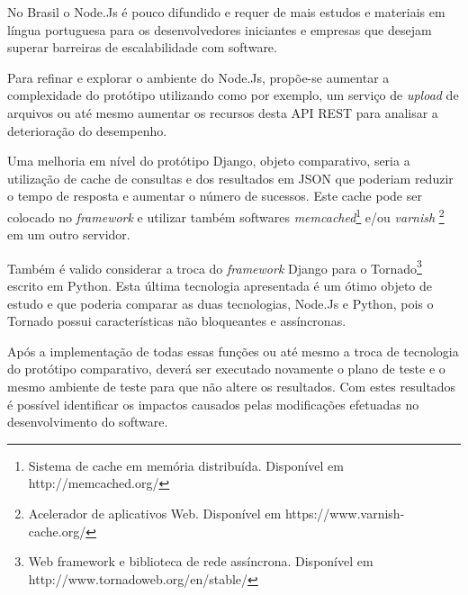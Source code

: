  No Brasil o Node.Js é pouco difundido e requer de mais estudos e materiais em língua portuguesa para os desenvolvedores iniciantes
  e empresas que desejam superar barreiras de escalabilidade com software. 
  
  Para refinar e explorar o ambiente do Node.Js, propõe-se aumentar a complexidade do protótipo utilizando como por
  exemplo, um serviço de \textit{upload} de arquivos ou até mesmo aumentar os recursos desta API REST para analisar 
  a deterioração do desempenho.
 
  Uma melhoria em nível do protótipo Django, objeto comparativo, seria a utilização de cache de consultas e dos resultados em \ac{JSON} que poderiam
  reduzir o tempo de resposta e aumentar o número de sucessos. Este cache pode ser colocado no \textit{framework} e utilizar também
  softwares \textit{memcached}\footnote[20]{Sistema de cache em memória distribuída. Disponível em http://memcached.org/} e/ou \textit{varnish}
  \footnote[21]{Acelerador de aplicativos Web. Disponível em https://www.varnish-cache.org/} em um outro servidor.\cite{usandodjango}
  
  Também é valido considerar a troca do \textit{framework} Django para o Tornado\footnote[22]{Web framework e biblioteca de rede 
  assíncrona. Disponível em http://www.tornadoweb.org/en/stable/} escrito em Python.
  Esta última tecnologia apresentada é um ótimo objeto de estudo e que poderia comparar as duas tecnologias, Node.Js e Python, pois 
  o Tornado possui características não bloqueantes e assíncronas.\cite{tornadogloboesporte}

  Após a implementação de todas essas funções ou até mesmo a troca de tecnologia do protótipo comparativo, 
  deverá ser executado novamente o plano de teste e o mesmo ambiente de teste para que não altere os resultados. Com estes
  resultados é possível identificar os impactos causados pelas modificações efetuadas no desenvolvimento do software.
